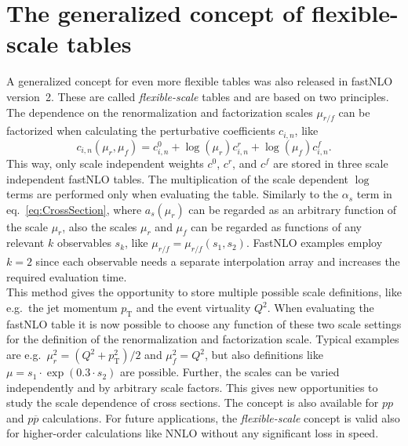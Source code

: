\documentclass{DISproc}
\begin{document}


\section{The generalized concept of flexible-scale tables}

A generalized concept for even more flexible tables was also released
in fastNLO version~2.
These are called \emph{flexible-scale} tables and are based on two principles.\\
The dependence on the renormalization and factorization scales
$\mu_{r/f}$ can be factorized when calculating the
perturbative coefficients $c_{i,n}$, like
\begin{equation}\label{eq:ScaleIndependentWeights}
  c_{i,n}(\mu_r,\mu_f) = c_{i,n}^0 + \log(\mu_r)c_{i,n}^r +  \log(\mu_f) c_{i,n}^f.
\end{equation}
This way, only scale independent weights $c^0$, $c^r$, and $c^f$ are
stored in three scale independent fastNLO tables.  The multiplication
of the scale dependent $\log$ terms are performed only when evaluating
the table.  Similarly to the $\alpha_s$ term in
eq.~\ref{eq:CrossSection}, where $a_s(\mu_r)$ can be regarded as an
arbitrary function of the scale $\mu_r$, also the scales $\mu_r$ and
$\mu_f$ can be regarded as functions of any relevant $k$ observables
$s_k$, like $\mu_{r/f} = \mu_{r/f}(s_1,s_2)$.
FastNLO examples employ $k=2$ since each observable needs a separate
interpolation array and increases the required evaluation time.\\
This method gives the opportunity to store multiple possible scale
definitions, like e.g.\ the jet momentum $p_\mathrm{T}$ and the event
virtuality $Q^2$.  When evaluating the fastNLO table it is now
possible to choose any function of these two scale settings for the
definition of the renormalization and factorization scale. Typical
examples are e.g.\ $\mu_r^2 = (Q^2+p^2_\mathrm{T})/2$ and $\mu_f^2 =
Q^2$, but also definitions like $\mu = s_1 \cdot \exp(0.3 \cdot s_2)$
are possible.  Further, the scales can be varied independently and by
arbitrary scale factors.  This gives new opportunities to study the
scale dependence of cross sections.  The concept is also available for
$pp$ and $p\overline{p}$ calculations.  For future applications, the
\emph{flexible-scale} concept is valid also for higher-order
calculations like NNLO without any significant loss in speed.
\end{document}
